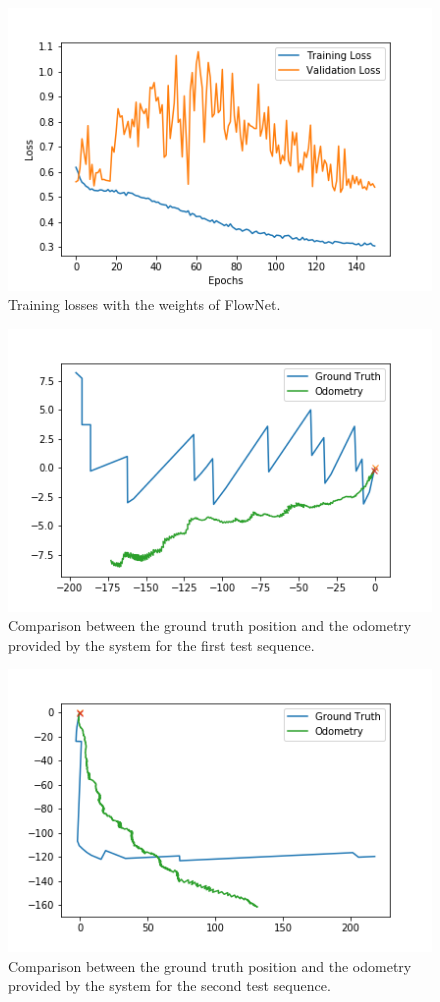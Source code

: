     \begin{figure}[h]
        \centering
        \includegraphics[width=0.65\columnwidth]{figuras/train_batch_dropout_150.png}
        \caption{Training losses with the weights of FlowNet.}
        \label{fig:train150}
    \end{figure}
    
    \begin{figure}[h]
        \centering
        \includegraphics[width=0.65\columnwidth]{figuras/testeSeq2.png}
        \caption{Comparison between the ground truth position and the odometry provided by the system for the first test sequence.}
        \label{fig:seq2}
    \end{figure}
    
    \begin{figure}[h]
        \centering
        \includegraphics[width=0.65\columnwidth]{figuras/testeSeq4.png}
        \caption{Comparison between the ground truth position and the odometry provided by the system for the second test sequence.}
        \label{fig:seq4}
    \end{figure}
    
